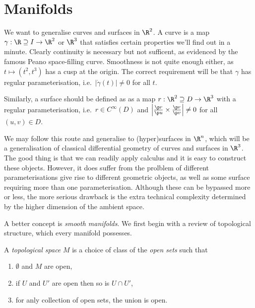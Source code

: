 \documentclass[a4paper]{article}
\begin{document}


\tableofcontents

\section{Manifolds}

We want to generalise curves and surfaces in \(\R^2\). A curve is a map \(\gamma: \R \supseteq I \to \R^2\) or \(\R^3\) that satisfies certain properties we'll find out in a minute. Clearly continuity is necessary but not sufficent, as evidenced by the famous Peano space-filling curve. Smoothness is not quite enough either, as \(t \mapsto (t^2, t^3)\) has a cusp at the origin. The correct requirement will be that \(\gamma\) has regular parameterisation, i.e.\ \(|\dot \gamma(t)| \neq 0\) for all \(t\).

Similarly, a surface should be defined as as a map \(r: \R^2 \supseteq D \to \R^3\) with a regular parameterisation, i.e.\ \(r \in C^\infty(D)\) and \(\left| \frac{\p r}{\p u} \times \frac{\p r}{\p v} \right| \neq 0\) for all \((u, v) \in D\).

We may follow this route and generalise to (hyper)surfaces in \(\R^n\), which will be a generalisation of classical differential geometry of curves and surfaces in \(\R^3\). The good thing is that we can readily apply calculus and it is easy to construct these objects. However, it does suffer from the prolblem of different parameterisations give rise to different geometric objects, as well as some surface requiring more than one parameterisation. Although these can be bypassed more or less, the more serious drawback is the extra technical complexity determined by the higher dimension of the ambient space.

A better concept is \emph{smooth manifolds}. We first begin with a review of topological structure, which every manifold possesses.

\begin{definition}
  A \emph{topological space} \(M\) is a choice of class of the \emph{open sets} such that
  \begin{enumerate}
  \item \(\emptyset\) and \(M\) are open,
  \item if \(U\) and \(U'\) are open then so is \(U \cap U'\),
  \item for anly collection of open sets, the union is open.
  \end{enumerate}
\end{definition}
\end{document}

